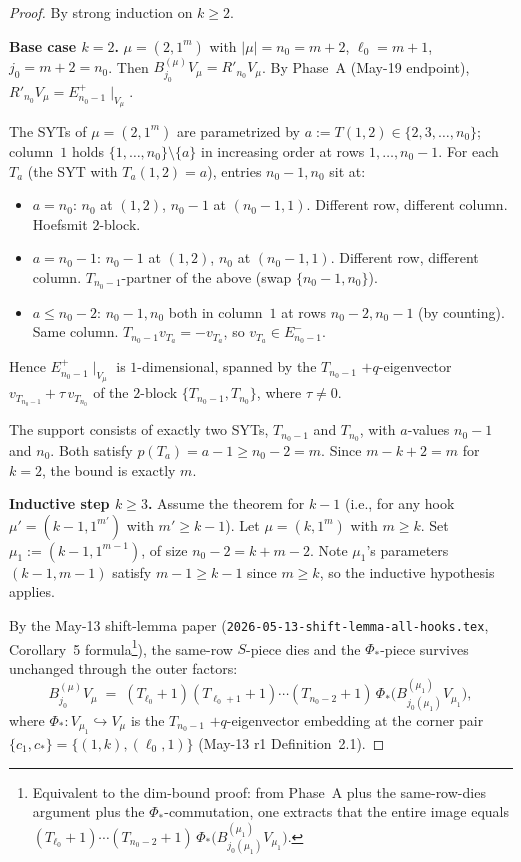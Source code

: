 \documentclass[11pt]{article}
\theoremstyle{definition}
\begin{document}
\begin{proof}
By strong induction on $k \ge 2$.

\medskip\noindent\textbf{Base case $k = 2$.}  $\mu = (2, 1^m)$ with
$|\mu| = n_0 = m + 2$, $\ell_0 = m + 1$, $j_0 = m + 2 = n_0$.  Then
$B^{(\mu)}_{j_0} V_\mu = R'_{n_0} V_\mu$.  By Phase~A
(May-19 endpoint), $R'_{n_0} V_\mu = E_{n_0 - 1}^+\!\mid_{V_\mu}$.

The SYTs of $\mu = (2, 1^m)$ are parametrized by $a := T(1, 2) \in
\{2, 3, \ldots, n_0\}$; column~$1$ holds $\{1, \ldots, n_0\}
\setminus \{a\}$ in increasing order at rows $1, \ldots, n_0 - 1$.
For each $T_a$ (the SYT with $T_a(1, 2) = a$), entries $n_0 - 1, n_0$
sit at:
\begin{itemize}[topsep=0.3em,itemsep=0.1em,leftmargin=2em]
\item $a = n_0$: $n_0$ at $(1, 2)$, $n_0 - 1$ at $(n_0 - 1, 1)$.
  Different row, different column.  Hoefsmit $2$-block.
\item $a = n_0 - 1$: $n_0 - 1$ at $(1, 2)$, $n_0$ at $(n_0 - 1, 1)$.
  Different row, different column.  $T_{n_0 - 1}$-partner of the
  above (swap $\{n_0 - 1, n_0\}$).
\item $a \le n_0 - 2$: $n_0 - 1, n_0$ both in column~$1$ at rows
  $n_0 - 2, n_0 - 1$ (by counting).  Same column.  $T_{n_0 - 1} v_{T_a}
  = -v_{T_a}$, so $v_{T_a} \in E_{n_0 - 1}^-$.
\end{itemize}
Hence $E_{n_0 - 1}^+\!\mid_{V_\mu}$ is $1$-dimensional, spanned by
the $T_{n_0 - 1}$ $+q$-eigenvector $v_{T_{n_0 - 1}} + \tau\,v_{T_{n_0}}$
of the $2$-block $\{T_{n_0 - 1}, T_{n_0}\}$, where $\tau \ne 0$.

The support consists of exactly two SYTs, $T_{n_0 - 1}$ and $T_{n_0}$,
with $a$-values $n_0 - 1$ and $n_0$.  Both satisfy $p(T_a) = a - 1
\ge n_0 - 2 = m$.  Since $m - k + 2 = m$ for $k = 2$, the bound is
exactly $m$.

\medskip\noindent\textbf{Inductive step $k \ge 3$.}  Assume the
theorem for $k - 1$ (i.e., for any hook $\mu' = (k-1, 1^{m'})$ with
$m' \ge k - 1$).  Let $\mu = (k, 1^m)$ with $m \ge k$.  Set
$\mu_1 := (k-1, 1^{m-1})$, of size $n_0 - 2 = k + m - 2$.  Note
$\mu_1$'s parameters $(k - 1, m - 1)$ satisfy $m - 1 \ge k - 1$
since $m \ge k$, so the inductive hypothesis applies.

By the May-13 shift-lemma paper
(\texttt{2026-05-13-shift-lemma-all-hooks.tex}, Corollary~5
formula\footnote{Equivalent to the dim-bound proof: from Phase~A
plus the same-row-dies argument plus the $\Phi_*$-commutation, one
extracts that the entire image equals
$(T_{\ell_0}{+}1)\cdots(T_{n_0-2}{+}1)\,\Phi_*\bigl(B^{(\mu_1)}_{j_0(\mu_1)}
V_{\mu_1}\bigr)$.}), the same-row $S$-piece dies and the
$\Phi_*$-piece survives unchanged through the outer factors:
\begin{equation}\label{eq:hook-formula}
   B^{(\mu)}_{j_0} V_\mu
   \;=\;
   (T_{\ell_0}{+}1)(T_{\ell_0+1}{+}1)\cdots(T_{n_0 - 2}{+}1)\,
   \Phi_*\bigl(B^{(\mu_1)}_{j_0(\mu_1)} V_{\mu_1}\bigr),
\end{equation}
where $\Phi_* : V_{\mu_1} \hookrightarrow V_\mu$ is the
$T_{n_0 - 1}$ $+q$-eigenvector embedding at the corner pair
$\{c_1, c_*\} = \{(1, k), (\ell_0, 1)\}$ (May-13 r1
Definition~2.1).


\end{proof}
\end{document}
